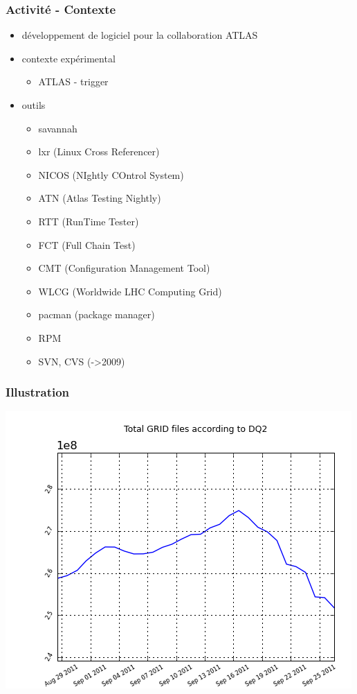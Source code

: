 \documentclass[bigger]{beamer}
\begin{document}
\begin{frame}
\frametitle{Activit\'e - Contexte}
\label{sec-1-4}


\begin{itemize}
\item d\'eveloppement de logiciel pour la collaboration ATLAS
\item contexte exp\'erimental
\begin{itemize}
\item ATLAS - trigger
\end{itemize}
\item outils
\begin{itemize}
\item savannah
\item lxr (Linux Cross Referencer)
\item NICOS (NIghtly COntrol System)
\item ATN (Atlas Testing Nightly)
\item RTT (RunTime Tester)
\item FCT (Full Chain Test)
\item CMT (Configuration Management Tool)
\item WLCG (Worldwide LHC Computing Grid)
\item pacman (package manager)
\item RPM
\item SVN, CVS (->2009)
\end{itemize}
\end{itemize}
\end{frame}
\begin{frame}
\frametitle{Illustration}
\label{sec-1-5}


\includegraphics[width=.9\linewidth]{figs/global_evolution_files30.png}
\end{frame}
\end{document}
